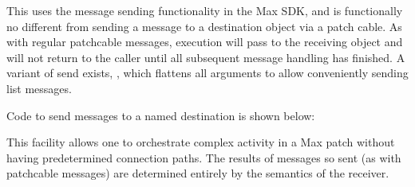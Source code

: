 \documentclass[letterpaper,10pt,english]{sphinxmanual}
\begin{document}
\sphinxAtStartPar
This uses the message sending functionality in the Max SDK, and is functionally no different
from sending a message to a destination object via a patch cable.
As with regular patch\sphinxhyphen{}cable messages, execution will pass to the receiving object and
will not return to the caller until all subsequent message handling has finished.
A variant of send exists, , which flattens all arguments to allow conveniently
sending list messages.

\sphinxAtStartPar
Code to send messages to a named destination is shown below:

\begin{sphinxVerbatim}[commandchars=\\\{\}]


\end{sphinxVerbatim}

\sphinxAtStartPar
This facility allows one to orchestrate complex activity in a Max patch without
having predetermined connection paths. The results of messages so sent (as
with patch\sphinxhyphen{}cable messages) are determined entirely by the semantics of the receiver.
\end{document}
